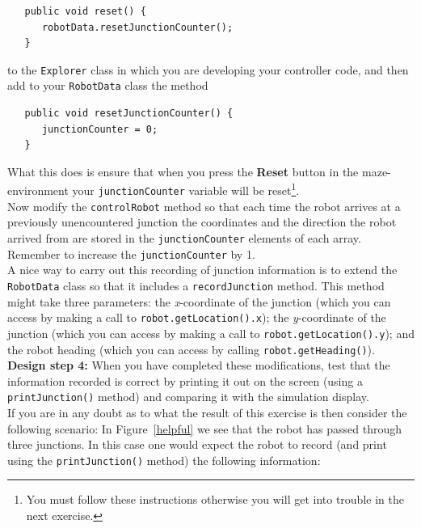 \begin{verbatim}
   public void reset() { 
      robotData.resetJunctionCounter(); 
   }
\end{verbatim}

\noindent to the {\tt Explorer} class in which you are developing
your controller code, and then add to your {\tt RobotData} class
the method \\

\begin{verbatim}
   public void resetJunctionCounter() {
      junctionCounter = 0; 
   }
\end{verbatim}

\noindent What this does is ensure that when you press the {\bf
Reset} button in the maze-environment your {\tt junctionCounter}
variable will be reset\footnote{You must follow these
instructions otherwise you will get into 
trouble in the next exercise.}. \\

 Now modify the {\tt controlRobot}
method so that each time the robot arrives at a previously
unencountered junction the coordinates and the direction the
robot arrived from are stored in the {\tt junctionCounter}
elements of each
array. Remember to increase the {\tt junctionCounter} by 1. \\

\noindent
A nice way to carry out this recording of junction information is to extend
the {\tt RobotData} class so that
it includes a {\tt recordJunction} method. This method might take three
parameters: the {\em x}-coordinate of the junction (which you can access
by making a call to {\tt robot.getLocation().x}); the {\em y}-coordinate of
the junction (which you can access by making a call to
{\tt robot.getLocation().y});
and the robot heading (which you can access by calling
{\tt robot.getHeading()}).\\

\noindent
{\bf Design step 4:}
When you have completed these modifications, test that the information
recorded is
correct by printing it out on the screen (using a {\tt printJunction()} method)
and comparing it with the simulation display. \\

\noindent
If you are in any doubt as to what the result of this exercise is
then consider the following scenario: In Figure~\ref{helpful} we
see that the robot has passed through three junctions. In this
case one would expect the robot to record (and print using
the {\tt printJunction()} method) the following information:


